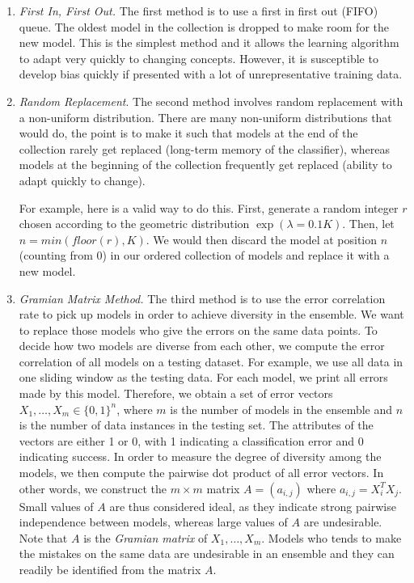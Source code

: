 \documentclass[conference]{IEEEtran}
\begin{document}
		\begin{enumerate}
			\item \emph{First In, First Out.} The first method is to use a first in first out (FIFO) queue. The oldest model in the collection is dropped to make room for the new model. This is the simplest method and it allows the learning algorithm to adapt very quickly to changing concepts. However, it is susceptible to develop bias quickly if presented with a lot of unrepresentative training data.
			
			\item \emph{Random Replacement}. The second method involves random replacement with a non-uniform distribution. There are many non-uniform distributions that would do, the point is to make it such that models at the end of the collection rarely get replaced (long-term memory of the classifier), whereas models at the beginning of the collection frequently get replaced (ability to adapt quickly to change).
			
			For example, here is a valid way to do this. First, generate a random integer $r$ chosen according to the geometric distribution $\exp(\lambda = 0.1 K)$. Then, let $n = min(floor(r), K)$. We would then discard the model at position $n$ (counting from 0) in our ordered collection of models and replace it with a new model.
			
			\item \emph{Gramian Matrix Method.} The third method is to use the error correlation rate to pick up models in order to achieve  diversity in the ensemble. We want to replace those models who give the errors on the same data points. To decide how two models are diverse from each other, we compute the error correlation of all models on a testing dataset. For example, we use all data in one sliding window as the testing data. For each model, we print all errors made by this model. Therefore, we obtain a set of error vectors $X_1, \ldots, X_m \in \{0,1\}^n$, where $m$ is the number of models in the ensemble and $n$ is the number of data instances in the testing set. The attributes of the vectors are either 1 or 0, with 1 indicating a classification error and 0 indicating success. In order to measure the degree of diversity among the models, we then compute the pairwise dot product of all error vectors. In other words, we construct the $m \times m$ matrix $A = (a_{i,j})$ where $a_{i,j} = X_i^T X_j$. Small values of $A$ are thus considered ideal, as they indicate strong pairwise independence between models, whereas large values of $A$ are undesirable. Note that $A$ is the \emph{Gramian matrix} of $X_1, \ldots, X_m$. Models who tends to make the mistakes on the same data are undesirable in an ensemble \cite{Dietterich} and they can readily be identified from the matrix $A$.
		\end{enumerate}
		
\end{document}
